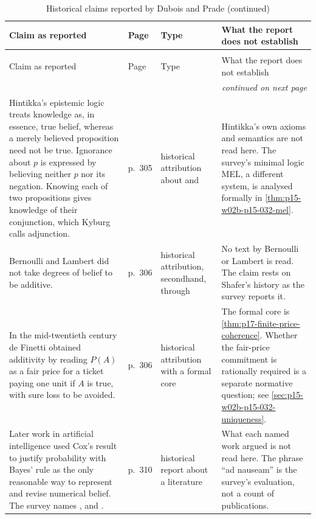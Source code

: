 \begin{longtable}{@{}p{.25\linewidth}p{.08\linewidth}p{.19\linewidth}p{.38\linewidth}@{}}
\caption{Historical claims reported by Dubois and Prade, with their type.}
\label{tab:p15-w02b-p15-032-history}\\
\toprule Claim as reported & Page & Type & What the report does not establish \\
\midrule\endfirsthead
\caption[]{Historical claims reported by Dubois and Prade (continued)}\\
\toprule Claim as reported & Page & Type & What the report does not establish \\
\midrule\endhead
\midrule\multicolumn{4}{r}{\emph{continued on next page}}\\
\endfoot
\endlastfoot
Hintikka's epistemic logic treats knowledge as, in essence, true belief,
whereas a merely believed proposition need not be true. Ignorance about
\(p\) is expressed by believing neither \(p\) nor its negation. Knowing
each of two propositions gives knowledge of their conjunction, which
Kyburg calls adjunction.
& p.~305 & historical attribution about \cite{Hintikka1962} and
\cite{R47Kyburg1997} &
Hintikka's own axioms and semantics are not read here. The survey's
minimal logic MEL, a different system, is analysed formally in
\cref{thm:p15-w02b-p15-032-mel}. \\
Bernoulli and Lambert did not take degrees of belief to be additive.
& p.~306 & historical attribution, secondhand, through
\cite{R47Shafer1978} &
No text by Bernoulli or Lambert is read. The claim rests on Shafer's
history as the survey reports it. \\
In the mid-twentieth century de Finetti obtained additivity by reading
\(P(A)\) as a fair price for a ticket paying one unit if \(A\) is true,
with sure loss to be avoided. & p.~306 & historical attribution with a
formal core & The formal core is \cref{thm:p17-finite-price-coherence}. Whether
the fair-price commitment is rationally required is a separate normative
question; see \cref{sec:p15-w02b-p15-032-uniqueness}. \\
Later work in artificial intelligence used Cox's result to justify
probability with Bayes' rule as the only reasonable way to represent and
revise numerical belief. The survey names
\cite{R47HorvitzHeckermanLanglotz1986}, \cite{R47Cheeseman1988} and
\cite{R47Jaynes2003}. & p.~310 & historical report about a literature &
What each named work argued is not read here. The phrase ``ad nauseam''
is the survey's evaluation, not a count of publications. \\

\end{longtable}
